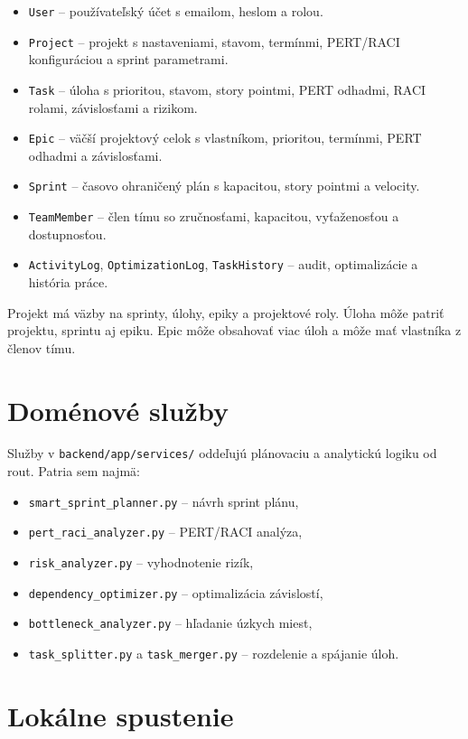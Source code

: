 ﻿\documentclass[12pt,a4paper]{article}
\begin{document}
\begin{itemize}
  \item \texttt{User} -- používateľský účet s emailom, heslom a rolou.
  \item \texttt{Project} -- projekt s nastaveniami, stavom, termínmi, PERT/RACI konfiguráciou a sprint parametrami.
  \item \texttt{Task} -- úloha s prioritou, stavom, story pointmi, PERT odhadmi, RACI rolami, závislosťami a rizikom.
  \item \texttt{Epic} -- väčší projektový celok s vlastníkom, prioritou, termínmi, PERT odhadmi a závislosťami.
  \item \texttt{Sprint} -- časovo ohraničený plán s kapacitou, story pointmi a velocity.
  \item \texttt{TeamMember} -- člen tímu so zručnosťami, kapacitou, vyťaženosťou a dostupnosťou.
  \item \texttt{ActivityLog}, \texttt{OptimizationLog}, \texttt{TaskHistory} -- audit, optimalizácie a história práce.
\end{itemize}

Projekt má väzby na sprinty, úlohy, epiky a projektové roly. Úloha môže patriť projektu, sprintu aj epiku. Epic môže obsahovať viac úloh a môže mať vlastníka z členov tímu.

\section{Doménové služby}

Služby v \texttt{backend/app/services/} oddeľujú plánovaciu a analytickú logiku od rout. Patria sem najmä:

\begin{itemize}
  \item \texttt{smart\_sprint\_planner.py} -- návrh sprint plánu,
  \item \texttt{pert\_raci\_analyzer.py} -- PERT/RACI analýza,
  \item \texttt{risk\_analyzer.py} -- vyhodnotenie rizík,
  \item \texttt{dependency\_optimizer.py} -- optimalizácia závislostí,
  \item \texttt{bottleneck\_analyzer.py} -- hľadanie úzkych miest,
  \item \texttt{task\_splitter.py} a \texttt{task\_merger.py} -- rozdelenie a spájanie úloh.
\end{itemize}

\section{Lokálne spustenie}
\end{document}
